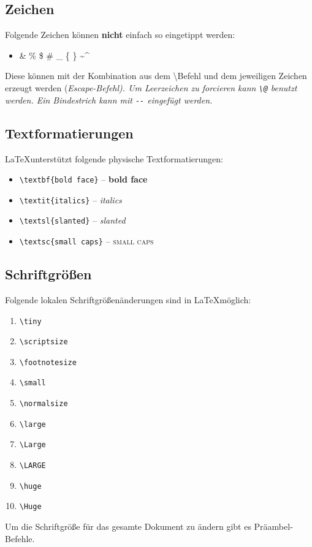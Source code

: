 \documentclass[10pt]{article}  %
\begin{document}
    \subsection{Zeichen}
        Folgende Zeichen können \textbf{nicht} einfach so eingetippt werden:
        \begin{itemize}
            \item \& \@ \% \@ \$ \@ \# \@ \_ \@ \{ \@ \} \@ \~ \@ \^ \@
        \end{itemize}
        Diese können mit der Kombination aus dem \textbackslash \@ Befehl und dem jeweiligen Zeichen erzeugt werden (\em Escape-Befehl\normalfont).  %
        Um Leerzeichen zu forcieren kann \verb!\@! benutzt werden. Ein Bindestrich kann mit \verb!--! eingefügt werden.

    \subsection{Textformatierungen}
        \LaTeX \@ unterstützt folgende physische Textformatierungen:
        \begin{itemize}
            \item \verb!\textbf{bold face}! -- \textbf{bold face}
            \item \verb!\textit{italics}! -- \textit{italics}
            \item \verb!\textsl{slanted}! -- \textsl{slanted}
            \item \verb!\textsc{small caps}! -- \textsc{small caps}
        \end{itemize}

    \subsection{Schriftgrößen}
    Folgende lokalen Schriftgrößenänderungen sind in \LaTeX \@ möglich:
    \begin{enumerate}
        \item \verb!\tiny!
        \item \verb!\scriptsize!
        \item \verb!\footnotesize!
        \item \verb!\small!
        \item \verb!\normalsize!
        \item \verb!\large!
        \item \verb!\Large!
        \item \verb!\LARGE!
        \item \verb!\huge!
        \item \verb!\Huge!
    \end{enumerate}
    Um die Schriftgröße für das gesamte Dokument zu ändern gibt es Präambel-Befehle.
\end{document}
